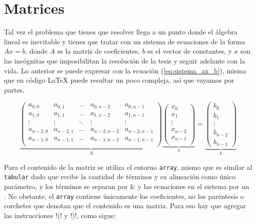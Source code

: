 \section{Matrices}
\label{sec:matrices}



Tal vez el problema que tienes que resolver llega a un punto donde el álgebra lineal es inevitable y tienes que tratar con un sistema de ecuaciones de la forma $Ax = b$, donde $A$ es la matriz de coeficientes, $b$ es el vector de constantes, y $x$ son las incógnitas que imposibilitan la resolución de la tesis y seguir adelante con la vida. Lo anterior se puede expresar con la ecuación (\ref{eq:sistema_ax_b}), misma que en código \LaTeX{} puede resultar un poco compleja, así que vayamos por partes.

\begin{equation}
\underbrace{
\left(
\begin{array}{ccccc}
a_{0, 0}   & a_{0, 1}   & \hdots & a_{0, n-2}   & a_{0, n-1}   \\
a_{1, 0}   & a_{1, 1}   & \hdots & a_{1, n-2}   & a_{1, n-1}   \\
\vdots     & \vdots     & \ddots & \vdots       & \vdots       \\
a_{n-2, 0} & a_{n-2, 1} & \hdots & a_{n-2, n-2} & a_{n-2, n-1} \\
a_{n-1, 0} & a_{n-1, 1} & \hdots & a_{n-1, n-2} & a_{n-1, n-1} \\
\end{array}
\right)
}_{A}
\underbrace{
\left(
\begin{array}{c}
x_0 \\ x_1 \\ \vdots \\ x_{n-2} \\ x_{n-1} \\
\end{array}
\right)
}_{x}
=
\underbrace{
\left(
\begin{array}{c}
b_{0} \\ b_{1} \\ \vdots \\ b_{n-2} \\ b_{n-1}
\end{array}
\right)
}_{b}
\label{eq:sistema_ax_b}
\end{equation}

Para el contenido de la matriz se utiliza el entorno \texttt{array}, mismo que es similar al \texttt{tabular} dado que recibe la cantidad de términos y su alineación como único parámetro, y los términos se separan por \& y las ecuaciones en el sistema por un \codigo{\textbackslash{}}. No obstante, el \texttt{array} contiene únicamente los coeficientes, no los paréntesis o corchetes que denotan que el contenido es una matriz. Para eso hay que agregar las instrucciones !\left(! y !\right)!, como sigue:

